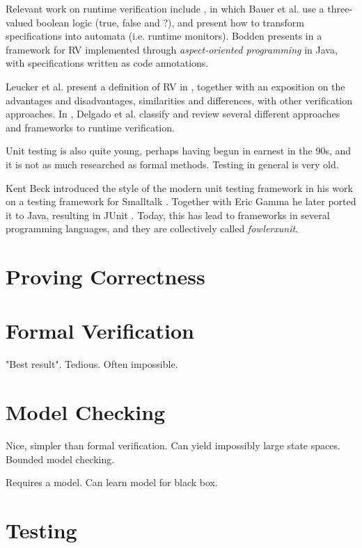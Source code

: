 \documentclass[a4paper,11pt]{kth-mag}
\begin{document}
Relevant work on runtime verification include \cite{bauer06}, in which Bauer et al. use a three-valued boolean logic (true, false and ?), and present how to transform specifications into automata (i.e. runtime monitors). Bodden presents in \cite{bodden05efficientrv} a framework for RV implemented through \emph{aspect-oriented programming} \cite{aspectj} in Java, with specifications written
as code annotations.

Leucker et al. present a definition of RV in \cite{leucker09abriefaccount}, together with an exposition on the advantages and disadvantages, similarities and differences, with other verification approaches. In \cite{delgado04taxonomy}, Delgado et al. classify and review several different approaches and frameworks to runtime verification.

Unit testing is also quite young, perhaps having begun in earnest in the 90s, and it is not as much researched as formal methods. Testing in general is very old.

Kent Beck introduced the style of the modern unit testing framework in his
work on a testing framework  for Smalltalk \cite{becksmalltalktesting}. 
Together with Eric Gamma he later ported it to Java, resulting in JUnit \cite{junit}. Today, this has lead to frameworks in several programming languages, and they are collectively called \textit{fowlerxunit}.

\section{Proving Correctness}

\section{Formal Verification}

"Best result". Tedious. Often impossible.

\section{Model Checking}

Nice, simpler than formal verification. Can yield impossibly large state spaces. Bounded model checking.

Requires a model. Can learn model for black box.

\section{Testing}
\end{document}
